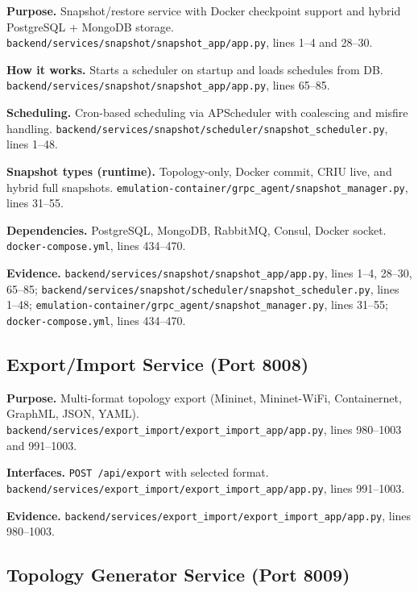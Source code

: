 \documentclass[10pt,a4paper]{article}
\begin{document}
\textbf{Purpose.} Snapshot/restore service with Docker checkpoint support and hybrid PostgreSQL + MongoDB storage. \texttt{backend/services/snapshot/snapshot\_app/app.py}, lines 1--4 and 28--30.

\textbf{How it works.} Starts a scheduler on startup and loads schedules from DB. \texttt{backend/services/snapshot/snapshot\_app/app.py}, lines 65--85.

\textbf{Scheduling.} Cron-based scheduling via APScheduler with coalescing and misfire handling. \texttt{backend/services/snapshot/scheduler/snapshot\_scheduler.py}, lines 1--48.

\textbf{Snapshot types (runtime).} Topology-only, Docker commit, CRIU live, and hybrid full snapshots. \texttt{emulation-container/grpc\_agent/snapshot\_manager.py}, lines 31--55.

\textbf{Dependencies.} PostgreSQL, MongoDB, RabbitMQ, Consul, Docker socket. \texttt{docker-compose.yml}, lines 434--470.

\textbf{Evidence.} \texttt{backend/services/snapshot/snapshot\_app/app.py}, lines 1--4, 28--30, 65--85; \texttt{backend/services/snapshot/scheduler/snapshot\_scheduler.py}, lines 1--48; \texttt{emulation-container/grpc\_agent/snapshot\_manager.py}, lines 31--55; \texttt{docker-compose.yml}, lines 434--470.

\subsection{Export/Import Service (Port 8008)}

\textbf{Purpose.} Multi-format topology export (Mininet, Mininet-WiFi, Containernet, GraphML, JSON, YAML). \texttt{backend/services/export\_import/export\_import\_app/app.py}, lines 980--1003 and 991--1003.

\textbf{Interfaces.} \texttt{POST /api/export} with selected format. \texttt{backend/services/export\_import/export\_import\_app/app.py}, lines 991--1003.

\textbf{Evidence.} \texttt{backend/services/export\_import/export\_import\_app/app.py}, lines 980--1003.

\subsection{Topology Generator Service (Port 8009)}
\end{document}
